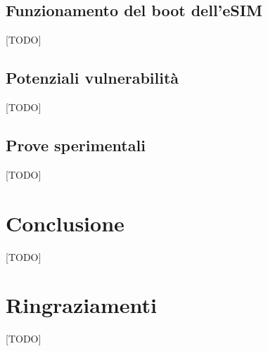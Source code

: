 \documentclass[10pt, twoside, openany]{book}
\begin{document}
\section{Funzionamento del boot dell'eSIM}
[TODO]

\section{Potenziali vulnerabilità}
[TODO]

\section{Prove sperimentali}
[TODO]

\chapter{Conclusione}
[TODO]



\chapter*{Ringraziamenti}
[TODO]
\end{document}
